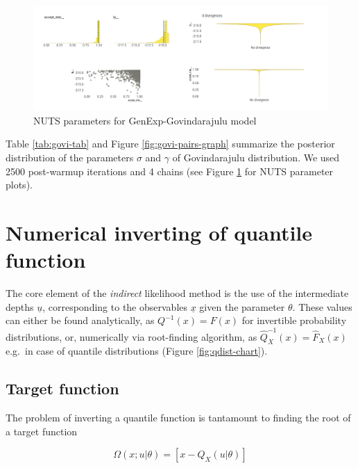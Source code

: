 \documentclass[
  12pt,
]{article}
\begin{document}
\begin{figure}

{\centering \includegraphics[width=1\linewidth]{ilbm_article_files/figure-latex/govi-nuts-graph-1} 

}

\caption{NUTS parameters for GenExp-Govindarajulu model}\label{fig:govi-nuts-graph}
\end{figure}

Table \ref{tab:govi-tab} and Figure \ref{fig:govi-pairs-graph} summarize the posterior distribution of the parameters \(\sigma\) and \(\gamma\) of Govindarajulu distribution. We used 2500 post-warmup iterations and 4 chains (see Figure \ref{fig:govi-nuts-graph} for NUTS parameter plots).

\hypertarget{numerical-inverting-of-quantile-function}{%
\section{Numerical inverting of quantile function}\label{numerical-inverting-of-quantile-function}}

The core element of the \emph{indirect} likelihood method is the use of the intermediate depths \(\underline{u}\), corresponding to the observables \(\underline{x}\) given the parameter \(\theta\). These values can either be found analytically, as \(Q^{-1}(x)=F(x)\) for invertible probability distributions, or, numerically via root-finding algorithm, as \(\widehat{Q}^{-1}_X(x)=\widehat{F}_X(x)\) e.g.~in case of quantile distributions (Figure \ref{fig:qdist-chart}).

\hypertarget{target-function}{%
\subsection{Target function}\label{target-function}}

The problem of inverting a quantile function is tantamount to finding the root of a target function

\[
 \Omega(x;u|\theta)=[x-Q_X(u|\theta)]
\]
\end{document}

